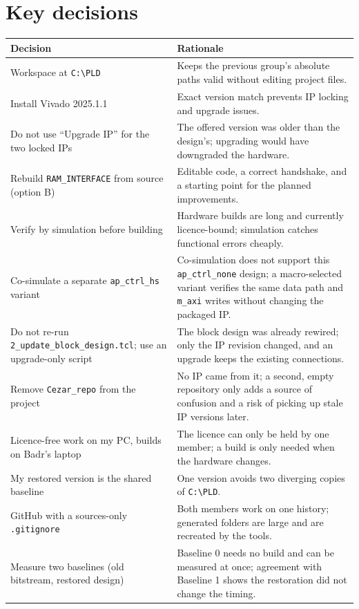 \documentclass[11pt,a4paper]{article}
\newcommand{\code}[1]{\texttt{#1}}
\begin{document}
\section{Key decisions}
\begin{longtable}{@{}p{}p{}@{}}
\toprule
\textbf{Decision} & \textbf{Rationale} \\
\midrule
\endhead
Workspace at \code{C:\textbackslash PLD} & Keeps the previous group's absolute paths valid without editing project files. \\
Install Vivado 2025.1.1 & Exact version match prevents IP locking and upgrade issues. \\
Do not use ``Upgrade IP'' for the two locked IPs & The offered version was older than the design's; upgrading would have downgraded the hardware. \\
Rebuild \code{RAM\_INTERFACE} from source (option B) & Editable code, a correct handshake, and a starting point for the planned improvements. \\
Verify by simulation before building & Hardware builds are long and currently licence-bound; simulation catches functional errors cheaply. \\
Co-simulate a separate \code{ap\_ctrl\_hs} variant & Co-simulation does not support this \code{ap\_ctrl\_none} design; a macro-selected variant verifies the same data path and \code{m\_axi} writes without changing the packaged IP. \\
Do not re-run \code{2\_update\_}\allowbreak\code{block\_design.tcl}; use an upgrade-only script & The block design was already rewired; only the IP revision changed, and an upgrade keeps the existing connections. \\
Remove \code{Cezar\_repo} from the project & No IP came from it; a second, empty repository only adds a source of confusion and a risk of picking up stale IP versions later. \\
Licence-free work on my PC, builds on Badr's laptop & The licence can only be held by one member; a build is only needed when the hardware changes. \\
My restored version is the shared baseline & One version avoids two diverging copies of \code{C:\textbackslash PLD}. \\
GitHub with a sources-only \code{.gitignore} & Both members work on one history; generated folders are large and are recreated by the tools. \\
Measure two baselines (old bitstream, restored design) & Baseline 0 needs no build and can be measured at once; agreement with Baseline 1 shows the restoration did not change the timing. \\

\end{longtable}
\end{document}
